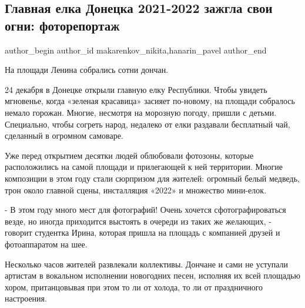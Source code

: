  
 
 
 

\subsection{Главная елка Донецка 2021-2022 зажгла свои огни: фоторепортаж}
\label{sec:24_12_2021.stz.news.ru.kp.1.doneck_jolka}

\ifcmt
 author_begin
   author_id makarenkov_nikita,hanarin_pavel
 author_end
\fi

На площади Ленина собрались сотни дончан.


24 декабря в Донецке открыли главную елку Республики. Чтобы увидеть мгновенье,
когда «зеленая красавица» засияет по-новому, на площади собралось немало
горожан. Многие, несмотря на морозную погоду, пришли с детьми. Специально,
чтобы согреть народ, недалеко от елки раздавали бесплатный чай, сделанный в
огромном самоваре.

Уже перед открытием десятки людей облюбовали фотозоны, которые расположились на
самой площади и прилегающей к ней территории. Многие композиции в этом году
стали сюрпризом для жителей: огромный белый медведь, трон около главной сцены,
инсталляция «2022» и множество мини-елок.


- В этом году много мест для фотографий! Очень хочется сфотографироваться
везде, но иногда приходится выстоять в очереди из таких же желающих, - говорит
студентка Ирина, которая пришла на площадь с компанией друзей и фотоаппаратом
на шее.

Несколько часов жителей развлекали коллективы. Дончане и сами не уступали
артистам в вокальном исполнении новогодних песен, исполняя их всей площадью
хором, пританцовывая при этом то ли от холода, то ли от праздничного
настроения.

